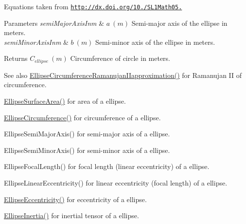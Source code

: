 Equations taken from \href{http://dx.doi.org/10.3247/SL1Math05.004}{\tt http\+://dx.\+doi.\+org/10./\+S\+L1\+Math05.} 
\begin{DoxyParams}{Parameters}
{\em semi\+Major\+Axis\+Inm} & $ a\ (m)$ Semi-\/major axis of the ellipse in meters. \\
\hline
{\em semi\+Minor\+Axis\+Inm} & $ b\ (m)$ Semi-\/minor axis of the ellipse in meters. \\
\hline
\end{DoxyParams}
\begin{DoxyReturn}{Returns}
$ C_{ellipse}\ (m)$ Circumference of circle in meters. 
\end{DoxyReturn}
\begin{DoxySeeAlso}{See also}
\mbox{\hyperlink{group___e_g_x_math-_geometry-2_d-_ellipse-_circumference_gaa908406db81fadc7c2d73e4e113d24d7}{Ellipse\+Circumference\+Ramanujan\+I\+Iapproximation()}} for Ramanujan II of circumference. 

\mbox{\hyperlink{group___e_g_x_math-_geometry-2_d-_ellipse-_surface_area_ga4ce8c8323e9718ce5458f4ab7f6d823d}{Ellipse\+Surface\+Area()}} for area of a ellipse. 

\mbox{\hyperlink{group___e_g_x_math-_geometry-2_d-_ellipse-_circumference_ga4172802ac674eb53467b44928ac635c7}{Ellipse\+Circumference()}} for circumference of a ellipse. 

Ellipse\+Semi\+Major\+Axis() for semi-\/major axis of a ellipse. 

Ellipse\+Semi\+Minor\+Axis() for semi-\/minor axis of a ellipse. 

Ellipse\+Focal\+Length() for focal length (linear eccentricity) of a ellipse. 

Ellipse\+Linear\+Eccentricity() for linear eccentricity (focal length) of a ellipse. 

\mbox{\hyperlink{group___e_g_x_math-_geometry-2_d-_ellipse-_eccentricity_ga6a0a7fba17f782616894cfc447628c33}{Ellipse\+Eccentricity()}} for eccentricity of a ellipse. 

\mbox{\hyperlink{group___e_g_x_math-_geometry-2_d-_ellipse-_inertia_ga10a3049c2f04b50f271fb01dc62e4cf8}{Ellipse\+Inertia()}} for inertial tensor of a ellipse. 
\end{DoxySeeAlso}
\mbox{\label{group___e_g_x_math-_geometry-2_d-_ellipse-_circumference_gaa908406db81fadc7c2d73e4e113d24d7}} 
